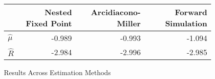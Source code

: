 \documentclass{article}
\begin{document}
\begin{enumerate}
\begin{enumerate}
\begin{answer}
\begin{figure}[h]
\centering
\caption{Results Across Estimation Methods}
\begin{tabular}{l|rrr} & Nested Fixed Point & Arcidiacono-Miller & Forward Simulation\\\hline
$\hat{\mu}$ & -0.989 & -0.993 & -1.094 \\
$\hat{R}$ & -2.984 & -2.996 & -2.985 \\
\end{tabular}
\end{figure}
\end{answer}

\end{enumerate}

\end{enumerate}
\end{document}
